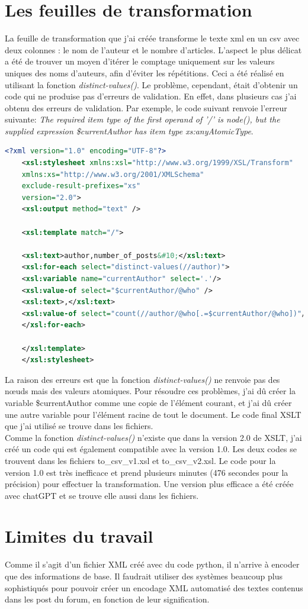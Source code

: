 \documentclass[12pt,a4paper]{article}
\begin{document}
\section{Les feuilles de transformation}
La feuille de transformation que j'ai créée transforme le texte xml en un csv avec deux colonnes : le nom de l'auteur et le nombre d'articles. L'aspect le plus délicat a été de trouver un moyen d'itérer le comptage uniquement sur les valeurs uniques des noms d'auteurs, afin d'éviter les répétitions. Ceci a été réalisé en utilisant la fonction \emph{distinct-values()}.  Le problème, cependant, était d'obtenir un code qui ne produise pas d'erreurs de validation. En effet, dans plusieurs cas j'ai obtenu des erreurs de validation. Par exemple, le code suivant renvoie l'erreur suivante: \emph{The required item type of the first operand of '/' is node(), but the supplied expression {\$currentAuthor} has item type xs:anyAtomicType}.

\begin{lstlisting}[language=XML]
	<?xml version="1.0" encoding="UTF-8"?>
	<xsl:stylesheet xmlns:xsl="http://www.w3.org/1999/XSL/Transform"
	xmlns:xs="http://www.w3.org/2001/XMLSchema"
	exclude-result-prefixes="xs"
	version="2.0">
	<xsl:output method="text" />
	
	<xsl:template match="/">
	
	<xsl:text>author,number_of_posts&#10;</xsl:text>
	<xsl:for-each select="distinct-values(//author)">
	<xsl:variable name="currentAuthor" select='.'/>
	<xsl:value-of select="$currentAuthor/@who" />
	<xsl:text>,</xsl:text>
	<xsl:value-of select="count(//author/@who[.=$currentAuthor/@who])"/>
	</xsl:for-each>
	
	</xsl:template>
	</xsl:stylesheet>
\end{lstlisting}

La raison des erreurs est que la fonction \emph{distinct-values()} ne renvoie pas des nœuds mais des valeurs atomiques. Pour résoudre ces problèmes, j'ai dû créer la variable \$currentAuthor comme une copie de l'élément courant, et j'ai dû créer une autre variable pour l'élément racine de tout le document. Le code final XSLT que j'ai utilisé se trouve dans les fichiers.
\\
Comme la fonction \emph{distinct-values()} n'existe que dans la version 2.0 de XSLT, j'ai créé un code qui est également compatible avec la version 1.0. Les deux codes se trouvent dans les fichiers to\_csv\_v1.xsl et to\_csv\_v2.xsl. Le code pour la version 1.0 est très inefficace et prend plusieurs minutes (476 secondes pour la précision) pour effectuer la transformation. Une version plus efficace a été créée avec chatGPT et se trouve elle aussi dans les fichiers. 

\section{Limites du travail}
Comme il s'agit d'un fichier XML créé avec du code python, il n'arrive à encoder que des informations de base. Il faudrait utiliser des systèmes beaucoup plus sophistiqués pour pouvoir créer un encodage XML automatisé des textes contenus dans les post du forum, en fonction de leur signification.
\end{document}
